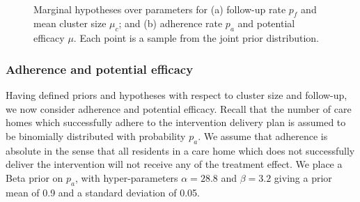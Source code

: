 \documentclass[AMA,STIX1COL]{WileyNJD-v2}
\begin{document}
\begin{figure}
   \centering
   \quad
   \\
   \caption{Marginal hypotheses over parameters for (a) follow-up rate $p_{f}$ and mean cluster size $\mu_{c}$; and (b) adherence rate $p_{a}$ and potential efficacy $\mu$. Each point is a sample from the joint prior distribution.}
   \label{fig:hyps}
\end{figure}

\subsubsection{Adherence and potential efficacy}

Having defined priors and hypotheses with respect to cluster size and follow-up, we now consider adherence and potential efficacy. Recall that the number of care homes which successfully adhere to the intervention delivery plan is assumed to be binomially distributed with probability $p_{a}$. We assume that adherence is absolute in the sense that all residents in a care home which does not successfully deliver the intervention will not receive any of the treatment effect. We place a Beta prior on $p_{a}$, with hyper-parameters $\alpha = 28.8$ and $\beta = 3.2$ giving a prior mean of 0.9 and a standard deviation of 0.05.
\end{document}
